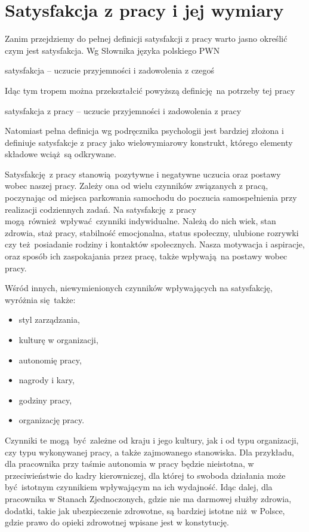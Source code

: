 \chapter{Satysfakcja z pracy i jej wymiary}
\label{sec:theory-sat}
Zanim przejdziemy do pełnej definicji satysfakcji z pracy warto jasno określić czym jest satysfakcja. Wg Słownika języka polskiego PWN
\begin{iquote}
satysfakcja -- uczucie przyjemności i zadowolenia z czegoś \cite{web:pwn-sat}
\end{iquote}
Idąc tym tropem można przekształcić powyższą definicję na potrzeby tej pracy
\begin{iquote}
satysfakcja z pracy -- uczucie przyjemności i zadowolenia z pracy
\end{iquote}

Natomiast pełna definicja wg podręcznika psychologii jest bardziej złożona i definiuje satysfakcje z pracy jako wielowymiarowy konstrukt, którego elementy składowe wciąż są odkrywane.

\begin{iquotation}
Satysfakcję z pracy stanowią pozytywne i negatywne uczucia oraz postawy wobec naszej pracy. Zależy ona od wielu czynników związanych z pracą, poczynając od miejsca parkowania samochodu do poczucia samospełnienia przy realizacji codziennych zadań. Na satysfakcję z pracy mogą również wpływać czynniki indywidualne. Należą do nich wiek, stan zdrowia, staż pracy, stabilność emocjonalna, status społeczny, ulubione rozrywki czy też posiadanie rodziny i kontaktów społecznych. Nasza motywacja i
aspiracje, oraz sposób ich zaspokajania przez pracę, także wpływają na postawy wobec pracy. \cite[str.296]{SchultzSat}
\end{iquotation}
Wśród innych, niewymienionych czynników wpływających na satysfakcję, wyróżnia się także:
\begin{itemize}
\item styl zarządzania,
\item kulturę w organizacji,
\item autonomię pracy,
\item nagrody i kary,
\item godziny pracy,
\item organizację pracy.
\end{itemize}
Czynniki te mogą być zależne od kraju i jego kultury, jak i od typu organizacji, czy typu wykonywanej pracy, a także zajmowanego stanowiska. Dla przykładu, dla pracownika przy taśmie autonomia w pracy będzie nieistotna, w przeciwieństwie do kadry kierowniczej, dla której to swoboda działania może być istotnym czynnikiem wpływającym na ich wydajność. Idąc dalej, dla pracownika w Stanach Zjednoczonych, gdzie nie ma darmowej służby zdrowia, dodatki, takie jak ubezpieczenie zdrowotne, są bardziej istotne niż w Polsce, gdzie prawo do opieki zdrowotnej wpisane jest w konstytucję. 

